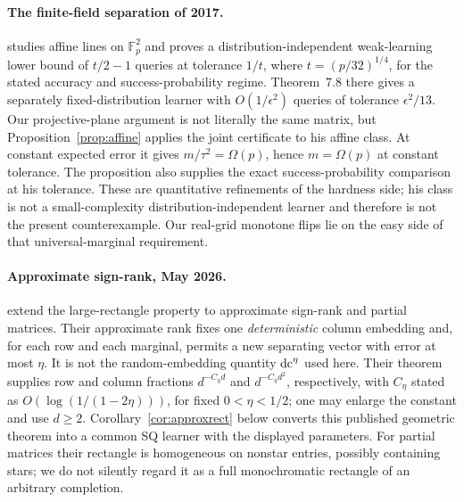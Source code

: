 \paragraph{The finite-field separation of 2017.}
\citet[Theorem~7.7]{Feldman17} studies affine lines on $\mathbb F_p^2$ and proves a distribution-independent weak-learning lower bound of $t/2-1$ queries at tolerance $1/t$, where $t=(p/32)^{1/4}$, for the stated accuracy and success-probability regime. Theorem~7.8 there gives a separately fixed-distribution learner with $O(1/\epsilon^2)$ queries of tolerance $\epsilon^2/13$. Our projective-plane argument is not literally the same matrix, but Proposition~\ref{prop:affine} applies the joint certificate to his affine class. At constant expected error it gives $m/\tau^2=\Omega(p)$, hence $m=\Omega(p)$ at constant tolerance. The proposition also supplies the exact success-probability comparison at his tolerance. These are quantitative refinements of the hardness side; his class is not a small-complexity distribution-independent learner and therefore is not the present counterexample. Our real-grid monotone flips lie on the easy side of that universal-marginal requirement.

\paragraph{Approximate sign-rank, May 2026.}
\citet[Theorem~1.3]{BHKR26} extend the large-rectangle property to approximate sign-rank and partial matrices. Their approximate rank fixes one \emph{deterministic} column embedding and, for each row and each marginal, permits a new separating vector with error at most $\eta$. It is not the random-embedding quantity $\operatorname{dc}^\eta$ used here. Their theorem supplies row and column fractions $d^{-C_\eta d}$ and $d^{-C_\eta d^2}$, respectively, with $C_\eta$ stated as $O(\log(1/(1-2\eta)))$, for fixed $0<\eta<1/2$; one may enlarge the constant and use $d\ge2$. Corollary~\ref{cor:approxrect} below converts this published geometric theorem into a common SQ learner with the displayed parameters. For partial matrices their rectangle is homogeneous on nonstar entries, possibly containing stars; we do not silently regard it as a full monochromatic rectangle of an arbitrary completion.

